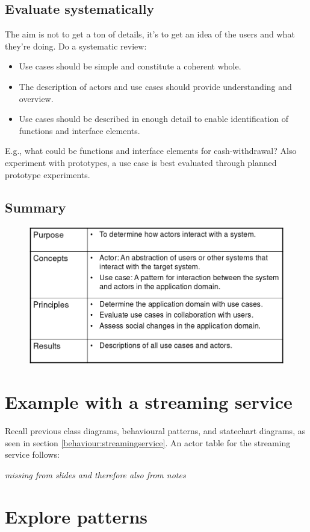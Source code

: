 \subsection{Evaluate systematically}
The aim is not to get a ton of details, it's to get an idea of the users and what they're doing. Do a systematic review:

\begin{itemize}
    \item Use cases should be simple and constitute a coherent whole. 
    \item The description of actors and use cases should provide understanding and overview. 
    \item Use cases should be described in enough detail to enable identification of functions and interface elements.
\end{itemize}

E.g., what could be functions and interface elements for cash-withdrawal? Also experiment with prototypes, a use case is best evaluated through planned prototype experiments.

\subsection{Summary}
\begin{figure}[H]
    \centering
    \includegraphics[width=.7\textwidth]{figures/usagesummary.png}
\end{figure}

\section{Example with a streaming service}
Recall previous class diagrams, behavioural patterns, and statechart diagrams, as seen in section \ref{behaviour:streamingservice}. An actor table for the streaming service follows:

\textit{missing from slides and therefore also from notes}

\section{Explore patterns}
